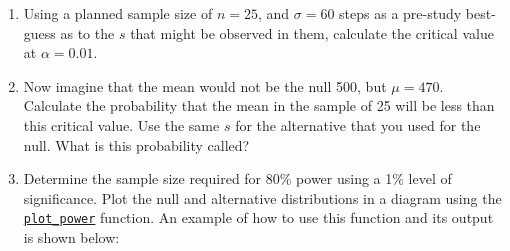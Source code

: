 \documentclass[letterpaper,9pt,twoside,printwatermark=false]{pinp}
\providecommand{\tightlist}{%
  \setlength{\itemsep}{0pt}\setlength{\parskip}{0pt}}
\begin{document}
\begin{enumerate}
\def\labelenumi{\alph{enumi}.}
\tightlist
\item
  Using a planned sample size of \(n=25\), and \(\sigma = 60\) steps as
  a pre-study best-guess as to the \(s\) that might be observed in them,
  calculate the critical value at \(\alpha = 0.01\).
\item
  Now imagine that the mean would not be the null 500, but \(\mu=470.\)
  Calculate the probability that the mean in the sample of 25 will be
  less than this critical value. Use the same \(s\) for the alternative
  that you used for the null. What is this probability called?
\item
  Determine the sample size required for 80\% power using a 1\% level of
  significance. Plot the null and alternative distributions in a diagram
  using the
  \href{https://raw.githubusercontent.com/sahirbhatnagar/EPIB607/master/assignments/a6/plot_null_alt.R}{\texttt{plot\_power}}
  function. An example of how to use this function and its output is
  shown below:
\end{enumerate}

\begin{Shaded}
\begin{Highlighting}[]
\NormalTok{(}\NormalTok{)}

\StringTok{ } 
\StringTok{ }\OperatorTok{*-} 
\StringTok{ } 
\StringTok{ } 
\StringTok{ }\OperatorTok{+}\StringTok{ }\NormalTok{(}\NormalTok{) }\OperatorTok{*}\StringTok{ }\OperatorTok{/}\StringTok{ }

\NormalTok{(}
            \NormalTok{,}
            \NormalTok{)}
\end{Highlighting}
\end{Shaded}
\end{document}
